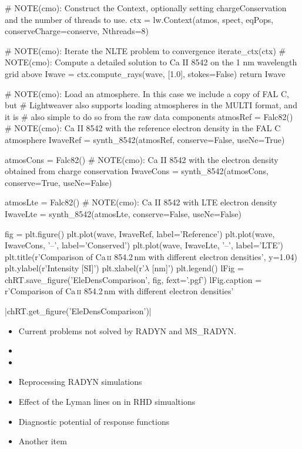 \begin{pycode}[TimeDepRT]
    # NOTE(cmo): Construct the Context, optionally setting chargeConservation and the number of threads to use.
    ctx = lw.Context(atmos, spect, eqPops, conserveCharge=conserve, Nthreads=8)

    # NOTE(cmo): Iterate the NLTE problem to convergence
    iterate_ctx(ctx)
    # NOTE(cmo): Compute a detailed solution to Ca II 8542 on the 1 nm wavelength grid above
    Iwave = ctx.compute_rays(wave, [1.0], stokes=False)
    return Iwave

# NOTE(cmo): Load an atmosphere. In this case we include a copy of FAL C, but
# Lightweaver also supports loading atmospheres in the MULTI format, and it is
# also simple to do so from the raw data components
atmosRef = Falc82()
# NOTE(cmo): Ca II 8542 with the reference electron density in the FAL C atmosphere
IwaveRef = synth_8542(atmosRef, conserve=False, useNe=True)

atmosCons = Falc82()
# NOTE(cmo): Ca II 8542 with the electron density obtained from charge conservation
IwaveCons = synth_8542(atmosCons, conserve=True, useNe=False)

atmosLte = Falc82()
# NOTE(cmo): Ca II 8542 with LTE electron density
IwaveLte = synth_8542(atmosLte, conserve=False, useNe=False)

fig = plt.figure()
plt.plot(wave, IwaveRef, label='Reference')
plt.plot(wave, IwaveCons, '--', label='Conserved')
plt.plot(wave, IwaveLte, '--', label='LTE')
plt.title(r'Comparison of Ca\,\textsc{ii} 854.2\,nm with different electron densities', y=1.04)
plt.ylabel(r'Intensity [SI]')
plt.xlabel(r'$\lambda$ [nm]')
plt.legend()
lFig = chRT.save_figure('EleDensComparison', fig, fext='.pgf')
lFig.caption = r'Comparison of Ca\,\textsc{ii} 854.2\,nm with different electron densities'
\end{pycode}

\py[TimeDepRT]|chRT.get_figure('EleDensComparison')|

\begin{itemize}
    \item Current problems not solved by RADYN and MS\_RADYN.
    \item \Lw{}
    \item \MsLw{}
    \item Reprocessing RADYN simulations
    \item Effect of the Lyman lines on \CaLine{} in RHD simualtions
    \item Diagnostic potential of response functions
    \item Another item
\end{itemize}